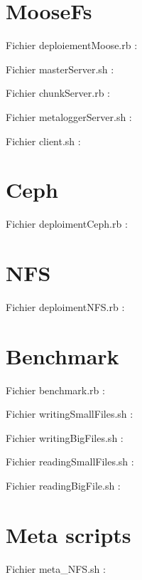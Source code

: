 \documentclass[12pt]{report}
\begin{document}
			\section{MooseFs}
                                Fichier deploiementMoose.rb :
                                
                                Fichier masterServer.sh :
                                
\newpage
                                Fichier chunkServer.rb :
                                
                                Fichier metaloggerServer.sh :
                                
                                Fichier client.sh :
                                
			\section{Ceph}
			\label{DepCeph}
				Fichier deploimentCeph.rb :
				
			\section{NFS}
				Fichier deploimentNFS.rb :
				
			\section{Benchmark}
				Fichier benchmark.rb :
				

				Fichier writingSmallFiles.sh :
				

				Fichier writingBigFiles.sh :
				

				Fichier readingSmallFiles.sh :
				

				Fichier readingBigFile.sh :
				
			\section{Meta scripts}
				Fichier meta\_NFS.sh :
				
\end{document}
